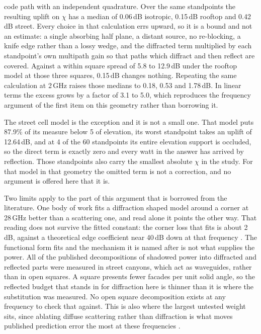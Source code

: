 code path with an independent quadrature. Over the same standpoints the
resulting uplift on $\chi$ has a median of 0.06\,dB isotropic, 0.15\,dB rooftop
and 0.42\,dB street. Every choice
in that calculation errs upward, so it is a bound and not an estimate: a single
absorbing half plane, a distant source, no re-blocking, a knife edge rather than
a lossy wedge, and the diffracted term multiplied by each standpoint's own
multipath gain so that paths which diffract and then reflect are covered. Against
a within square spread of 5.8 to 12.9\,dB under the rooftop model at those three
squares, 0.15\,dB changes nothing. Repeating
the same calculation at 2\,GHz raises those medians to 0.18, 0.53 and 1.78\,dB.
In linear terms the excess grows by a factor of 3.1 to 5.0, which reproduces the
frequency argument of the first item
on this geometry rather than borrowing it.

The street cell model is the exception and it is not a small one. That model puts
87.9\% of its measure below 5\textdegree{} of elevation, its worst standpoint
takes an uplift of 12.64\,dB, and at 4 of the 60 standpoints its entire elevation
support is occluded, so the direct term is exactly zero and every watt in the
answer has arrived by reflection. Those standpoints also carry the smallest
absolute $\chi$ in the study. For that model in that geometry the omitted term is
not a correction, and no argument is offered here that it is.

Two limits apply to the part of this argument that is borrowed from the
literature. One body of work fits a diffraction shaped model around a corner at
28\,GHz better than a scattering one, and read alone it points the other way.
That reading does not survive the fitted constant: the corner loss that fits is
about 2\,dB, against a theoretical edge coefficient near 40\,dB down at that
frequency \cite{duchizhik}. The functional form fits and the mechanism it is
named after is not what supplies the power. All of the published decompositions
of shadowed power into diffracted and reflected parts were measured in street
canyons, which act as waveguides, rather than in open squares. A square presents fewer facades per unit solid angle, so the
reflected budget that stands in for diffraction here is thinner than it is where
the substitution was measured. No open square decomposition exists at any
frequency to check that against. This is also where the largest untested weight
sits, since ablating diffuse scattering rather than diffraction is what moves
published prediction error the most at these frequencies \cite{vitucci}.

